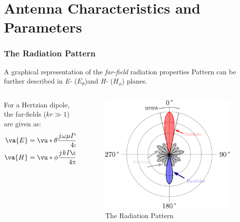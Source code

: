 \documentclass[10pt, compress]{beamer}
\renewcommand{\O}{\omega}  %
\renewcommand{\u}{\mu}  %
\renewcommand{\j}{{j}\mkern1mu} %
\begin{document}
\section*{Antenna Characteristics and Parameters}
\begin{frame}
  \frametitle{The Radiation Pattern}
\begin{outline}
  \1 A graphical representation of the \textit{far-field} radiation properties
  \1 Pattern can be further described in \textit{E-} ($E_{\theta}$)and \textit{H-} ($H_{\phi}$) planes.
    \begin{columns}[T] %
  \begin{column}{.35\textwidth}
  For a Hertzian dipole, the far-fields ($k r \gg 1$) are given as:
  \begin{align*}
    \va{E}  &= \vu*{\theta} \frac{ \j \O \u I  \dd{l}}{4 \pi r} \sin(\theta) \\
    \va{H}  &= \vu*{\phi} \frac{ \j k I  \dd{l}}{4 \pi r} \sin(\theta) 
  \end{align*}
   \end{column}
 \begin{column}[T]{.65\textwidth}
    \begin{figure}
      \centering
          \includegraphics[width=.9\textwidth]{src/lobes.pdf}
      \caption{The Radiation Pattern}
    \end{figure}
      \end{column}%
\end{columns}
\end{outline}
\end{frame}
\end{document}
